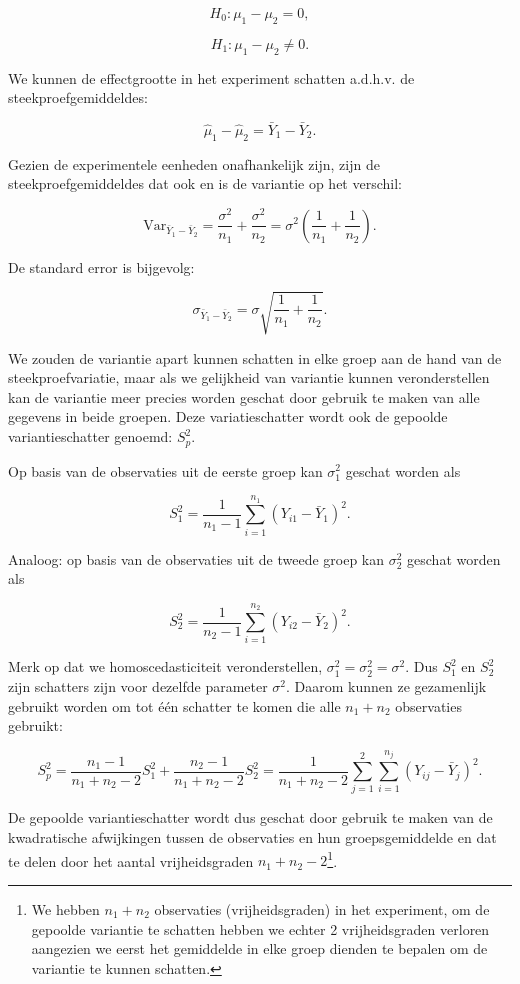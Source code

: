 \documentclass[
  12pt,dutch,coursenotes]{book}
\theoremstyle{definition}
\theoremstyle{definition}
\theoremstyle{definition}
\theoremstyle{remark}
\begin{document}
\[H_0: \mu_1-\mu_2 = 0,\]

\[H_1: \mu_1-\mu_2 \neq 0.\]

We kunnen de effectgrootte in het experiment schatten a.d.h.v. de steekproefgemiddeldes:

\[\hat \mu_1-\hat \mu_2=\bar Y_1 -\bar Y_2.\]

Gezien de experimentele eenheden onafhankelijk zijn, zijn de steekproefgemiddeldes dat ook en is de variantie op het verschil:

\[\text{Var}_{\bar Y_1 -\bar Y_2}=\frac{\sigma^2}{n_1}+\frac{\sigma^2}{n_2}=\sigma^2 \left(\frac{1}{n_1}+\frac{1}{n_2}\right).\]

De standard error is bijgevolg:

\[\sigma_{\bar Y_1 -\bar Y_2}=\sigma\sqrt{\frac{1}{n_1}+\frac{1}{n_2}}.\]

We zouden de variantie apart kunnen schatten in elke groep aan de hand van de steekproefvariatie, maar als we gelijkheid van variantie kunnen veronderstellen kan de variantie meer precies worden geschat door gebruik te maken van alle gegevens in beide groepen.
Deze variatieschatter wordt ook de gepoolde variantieschatter genoemd: \(S^2_p\).

Op basis van de observaties uit de eerste groep kan \(\sigma^2_1\) geschat worden als

\[S_1^2 = \frac{1}{n_1-1}\sum_{i=1}^{n_1} (Y_{i1}-\bar{Y}_1)^2.\]

Analoog: op basis van de observaties uit de tweede groep kan \(\sigma^2_2\) geschat worden als

\[S_2^2 = \frac{1}{n_2-1}\sum_{i=1}^{n_2} (Y_{i2}-\bar{Y}_2)^2.\]

Merk op dat we homoscedasticiteit veronderstellen, \(\sigma_1^2=\sigma_2^2=\sigma^2\). Dus \(S_1^2\) en \(S_2^2\) zijn schatters zijn voor dezelfde parameter \(\sigma^2\). Daarom kunnen ze gezamenlijk gebruikt worden om tot één schatter te komen die alle \(n_1+n_2\) observaties gebruikt:

\[  S_p^2 = \frac{n_1-1}{n_1+n_2-2} S_1^2 + \frac{n_2-1}{n_1+n_2-2} S_2^2 = \frac{1}{n_1+n_2-2}\sum_{j=1}^2\sum_{i=1}^{n_j} (Y_{ij} - \bar{Y}_j)^2.\]

De gepoolde variantieschatter wordt dus geschat door gebruik te maken van de kwadratische afwijkingen tussen de observaties en hun groepsgemiddelde en dat te delen door het aantal vrijheidsgraden \(n_1+n_2-2\)\footnote{We hebben \(n_1+n_2\) observaties (vrijheidsgraden) in het experiment, om de gepoolde variantie te schatten hebben we echter 2 vrijheidsgraden verloren aangezien we eerst het gemiddelde in elke groep dienden te bepalen om de variantie te kunnen schatten.}.
\end{document}
